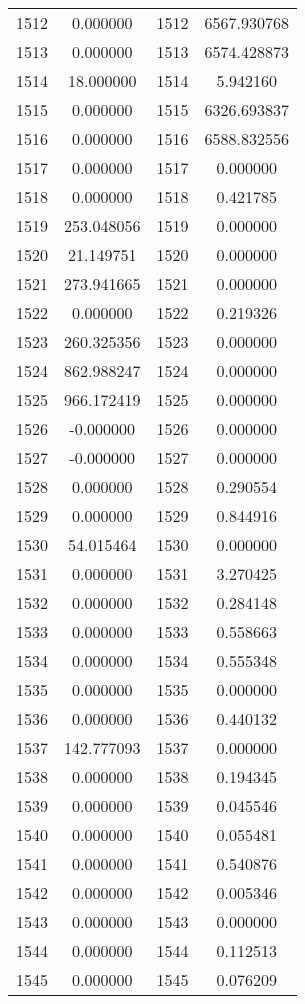 \documentclass[12pt]{article}
\begin{document}
\begin{longtable}{@{}cccc@{}}
1512 & 0.000000 & 1512 & 6567.930768 \\
1513 & 0.000000 & 1513 & 6574.428873 \\
1514 & 18.000000 & 1514 & 5.942160 \\
1515 & 0.000000 & 1515 & 6326.693837 \\
1516 & 0.000000 & 1516 & 6588.832556 \\
1517 & 0.000000 & 1517 & 0.000000 \\
1518 & 0.000000 & 1518 & 0.421785 \\
1519 & 253.048056 & 1519 & 0.000000 \\
1520 & 21.149751 & 1520 & 0.000000 \\
1521 & 273.941665 & 1521 & 0.000000 \\
1522 & 0.000000 & 1522 & 0.219326 \\
1523 & 260.325356 & 1523 & 0.000000 \\
1524 & 862.988247 & 1524 & 0.000000 \\
1525 & 966.172419 & 1525 & 0.000000 \\
1526 & -0.000000 & 1526 & 0.000000 \\
1527 & -0.000000 & 1527 & 0.000000 \\
1528 & 0.000000 & 1528 & 0.290554 \\
1529 & 0.000000 & 1529 & 0.844916 \\
1530 & 54.015464 & 1530 & 0.000000 \\
1531 & 0.000000 & 1531 & 3.270425 \\
1532 & 0.000000 & 1532 & 0.284148 \\
1533 & 0.000000 & 1533 & 0.558663 \\
1534 & 0.000000 & 1534 & 0.555348 \\
1535 & 0.000000 & 1535 & 0.000000 \\
1536 & 0.000000 & 1536 & 0.440132 \\
1537 & 142.777093 & 1537 & 0.000000 \\
1538 & 0.000000 & 1538 & 0.194345 \\
1539 & 0.000000 & 1539 & 0.045546 \\
1540 & 0.000000 & 1540 & 0.055481 \\
1541 & 0.000000 & 1541 & 0.540876 \\
1542 & 0.000000 & 1542 & 0.005346 \\
1543 & 0.000000 & 1543 & 0.000000 \\
1544 & 0.000000 & 1544 & 0.112513 \\
1545 & 0.000000 & 1545 & 0.076209 \\

\end{longtable}
\end{document}
